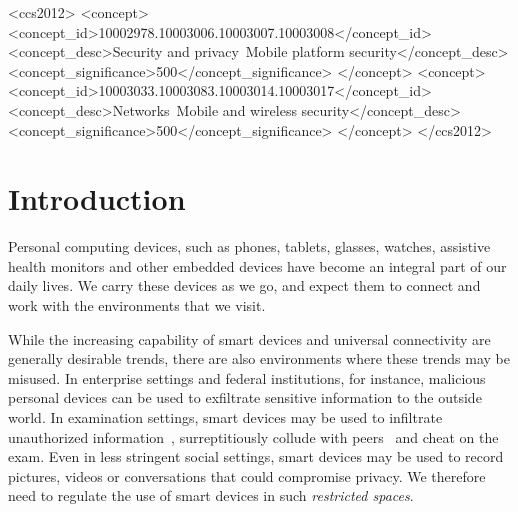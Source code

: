 \documentclass[pageno]{sig-alternate-05-2015}
\newcommand{\mysection}[1]{\section{#1}}
\newcommand{\addtext}[2]{#2}
\begin{document}
\begin{CCSXML}
<ccs2012>
<concept>
<concept_id>10002978.10003006.10003007.10003008</concept_id>
<concept_desc>Security and privacy~Mobile platform security</concept_desc>
<concept_significance>500</concept_significance>
</concept>
<concept>
<concept_id>10003033.10003083.10003014.10003017</concept_id>
<concept_desc>Networks~Mobile and wireless security</concept_desc>
<concept_significance>500</concept_significance>
</concept>
</ccs2012>
\end{CCSXML}


\printccsdesc



% 

\mysection{Introduction}
\label{section:introduction}


Personal computing devices, such as phones, tablets, glasses, watches,
assistive health monitors and other embedded devices have become an integral
part of our daily lives. We carry these devices as we go, and expect them to
connect and work with the environments that we visit.

While the increasing capability of smart devices and universal connectivity are
generally desirable trends, there are also environments where these trends may
be misused. In enterprise settings and federal institutions, for instance,
malicious personal devices can be used to exfiltrate sensitive information to
the outside world. In examination settings, smart devices may be used to
infiltrate unauthorized information~\cite{url:examcheating}, surreptitiously
collude with peers~\cite{smartwatch:fc14} and cheat on the exam.  Even in less
stringent social settings, smart devices may be used to record pictures, videos
or conversations that could compromise privacy. We therefore need to regulate
the use of smart devices in such \textit{restricted spaces}.
\end{document}
